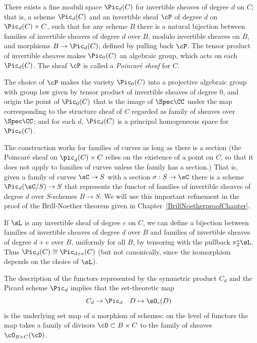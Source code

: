  \begin{fact}\cite[Theorem 9.4.8]{Kleiman-PicardScheme}
 There exists a fine moduli space $\Pic_d(C)$ for invertible sheaves of degree $d$ on $C$; that is, a scheme $\Pic_d(C)$ and an invertible sheaf $\cP$ of degree $d$ on $\Pic_d(C) \times C$, such that for any scheme $B$ there is a natural bijection between families of invertible sheaves of degree $d$ over $B$, modulo invertible sheaves on $B$, and morphisms $B \to \Pic_d(C)$, defined by pulling back $\cP$. The tensor product of invertible sheaves makes $\Pic_0(C)$ an algebraic group, which acts on each $\Pic_d(C)$. The sheaf $\cP$ is called a \emph{Poincar\'e sheaf} for $C$.

The choice of $\cP$ makes the variety $\Pic_0(C)$ into a projective algebraic group with group law given by tensor product of invertible sheaves of degree 0, and origin the point of $\Pic_0(C)$ that is the
 image of $\Spec \CC$ under the map corresponding to the structure sheaf of $C$ regarded
 as family of sheaves over $\Spec \CC$; and for each $d$, $\Pic_d(C)$ is a principal homogeneous space for $\Pic_0(C)$. 

The construction works for families of curves as long as there is a section (the Poincar\'e sheaf on $\pic_d(C) \times C$ relies on the existence of a point on $C$, so that it does not apply to families of curves unless the family has a section.) That is, given a family of curves $\sC \to S$ with a section $\sigma: S\to \sC$
 there is a scheme $\Pic_{d}(\sC/S) \to S$ that represents the functor of families of invertible sheaves of
 degree $d$ over $S$-schemes $B\to S$. We will use this important refinement in the proof of the Brill-Noether theorem given in Chapter~\ref{BrillNoetherproofChapter}.
  \end{fact}
  
If $\sL$ is any invertible sheaf of degree $e$ on $C$, we can define a bijection between families of invertible sheaves of degree $d$ over $B$ and families of invertible sheaves of degree $d+e$ over $B$, uniformly for all $B$, by tensoring with the pullback $\pi_2^*\sL$. Thus $\Pic_d(C) \cong \Pic_{d+e}(C)$ (but not canonically, since the isomorphism depends on the choice of $\sL$).
 
 
The description of the functors represented by the symmetric product $C_d$ and the Picard scheme $\Pic_d$ implies that the 
set-theoretic map
$$
C_d \to \Pic_d \quad D \mapsto \sO_c(D)
$$
is the underlying set map of a morphism of schemes: on the level of functors the map takes a family of divisors $\cD\subset B\times C$
to the family of sheaves $\cO_{B\times C}(\cD)$.

